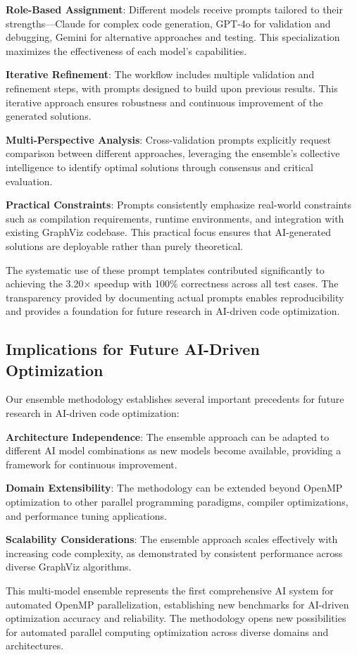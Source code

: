 \textbf{Role-Based Assignment}: Different models receive prompts tailored to their strengths—Claude for complex code generation, GPT-4o for validation and debugging, Gemini for alternative approaches and testing. This specialization maximizes the effectiveness of each model's capabilities.

\textbf{Iterative Refinement}: The workflow includes multiple validation and refinement steps, with prompts designed to build upon previous results. This iterative approach ensures robustness and continuous improvement of the generated solutions.

\textbf{Multi-Perspective Analysis}: Cross-validation prompts explicitly request comparison between different approaches, leveraging the ensemble's collective intelligence to identify optimal solutions through consensus and critical evaluation.

\textbf{Practical Constraints}: Prompts consistently emphasize real-world constraints such as compilation requirements, runtime environments, and integration with existing GraphViz codebase. This practical focus ensures that AI-generated solutions are deployable rather than purely theoretical.

The systematic use of these prompt templates contributed significantly to achieving the 3.20× speedup with 100\% correctness across all test cases. The transparency provided by documenting actual prompts enables reproducibility and provides a foundation for future research in AI-driven code optimization.

\subsection{Implications for Future AI-Driven Optimization}

Our ensemble methodology establishes several important precedents for future research in AI-driven code optimization:

\textbf{Architecture Independence}: The ensemble approach can be adapted to different AI model combinations as new models become available, providing a framework for continuous improvement.

\textbf{Domain Extensibility}: The methodology can be extended beyond OpenMP optimization to other parallel programming paradigms, compiler optimizations, and performance tuning applications.

\textbf{Scalability Considerations}: The ensemble approach scales effectively with increasing code complexity, as demonstrated by consistent performance across diverse GraphViz algorithms.

This multi-model ensemble represents the first comprehensive AI system for automated OpenMP parallelization, establishing new benchmarks for AI-driven optimization accuracy and reliability. The methodology opens new possibilities for automated parallel computing optimization across diverse domains and architectures.
